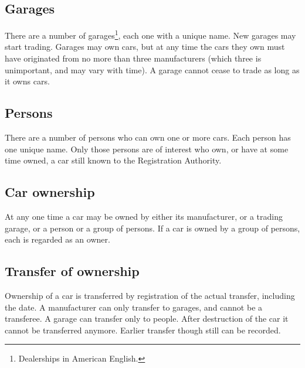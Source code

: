 \documentclass{article}
\begin{document}
\subsection{Garages}

There are a number of garages\footnote{Dealerships in American English.}, each
one with a unique name. New garages may start trading. Garages may own cars,
but at any time the cars they own must have originated from no more than three
manufacturers (which three is unimportant, and may vary with time). A garage
cannot cease to trade as long as it owns cars.

\subsection{Persons}

There are a number of persons who can own one or more cars. Each person has
one unique name. Only those persons are of interest who own, or have at some
time owned, a car still known to the Registration Authority.

\subsection{Car ownership}

At any one time a car may be owned by either its manufacturer, or a trading
garage, or a person or a group of persons. If a car is owned by a group of
persons, each is regarded as an owner.

\subsection{Transfer of ownership}

Ownership of a car is transferred by registration of the actual transfer,
including the date. A manufacturer can only transfer to garages, and cannot be
a transferee. A garage can transfer only to people. After destruction of the
car it cannot be transferred anymore. Earlier transfer though still can be
recorded.
\end{document}
